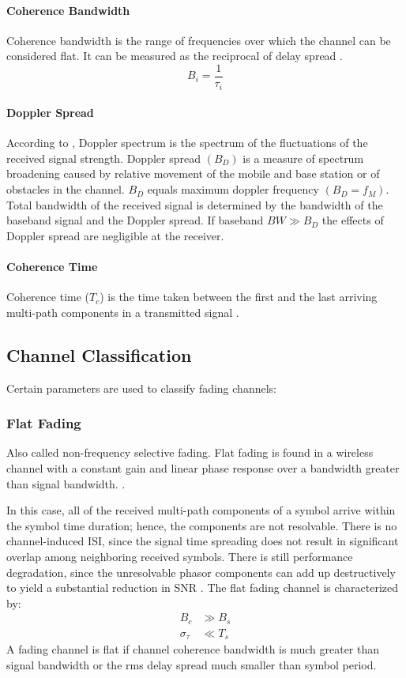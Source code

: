 \paragraph{Coherence Bandwidth}
Coherence bandwidth is the range of frequencies over which the channel can be considered flat\cite{Hindu}. It can be measured as the reciprocal of delay spread \cite{Proakis}.
$$B_i=\frac{1}{\tau_i} $$

\paragraph{Doppler Spread}
According to \cite{Hindu}, Doppler spectrum is the spectrum of the fluctuations of the received signal strength. Doppler spread $(B_D)$ is a measure of spectrum broadening caused by relative movement of the mobile and base station or of obstacles in the channel. $B_D$ equals maximum doppler frequency $(B_D = f_M)$. Total bandwidth of the received signal is determined by the bandwidth of the baseband signal and the Doppler spread. If baseband $BW\gg B_D$ the effects of Doppler spread are negligible at the receiver.

\paragraph{Coherence Time}
Coherence time ($T_c$) is the time taken between the first and the last arriving multi-path components in a transmitted signal \cite{Proakis}.

\subsection{Channel Classification}
Certain parameters are used to classify fading channels:
\subsubsection{Flat Fading} 
Also called non-frequency selective fading. Flat fading is found in a wireless channel with a constant gain and linear phase response over a bandwidth greater than signal bandwidth. \cite{fuqin}.

In this case, all of the received multi-path components of a symbol arrive within the symbol time duration; hence, the components are not resolvable. There is no channel-induced \gls{ISI}, since the signal time spreading does not result in significant overlap among neighboring received symbols. There is still performance degradation, since the unresolvable phasor components can add up destructively to yield a substantial reduction in \gls{SNR} \cite{AWGN}.
The flat fading channel is characterized by:
\begin{align*}
B_c &\gg B_s\\
\sigma_\tau &\ll T_s
\end{align*}
A fading channel is flat if channel coherence bandwidth is much greater than signal bandwidth or the rms delay spread much smaller than symbol period\cite{fuqin}.

